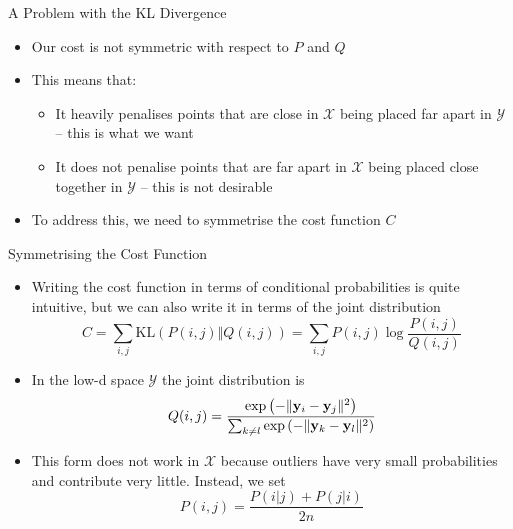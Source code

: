 \documentclass[aspectratio=169]{beamer}
\begin{document}
\begin{frame}{A Problem with the KL Divergence}
  \begin{itemize}
    \item Our cost is not symmetric with respect to $P$ and $Q$
    \item This means that:
    \begin{itemize}
      \item It heavily penalises points that are close in $\mathcal{X}$ being placed far apart in $\mathcal{Y}$ -- this is what we want
      \item It does not penalise points that are far apart in $\mathcal{X}$ being placed close together in $\mathcal{Y}$ -- this is not desirable
    \end{itemize}
    \item To address this, we need to symmetrise the cost function $C$
  \end{itemize} 
\end{frame}

\begin{frame}{Symmetrising the Cost Function}
  \begin{itemize}
    \item Writing the cost function in terms of conditional probabilities is quite intuitive, but we can also write it in terms of the joint distribution
    \begin{equation*}
      C = \sum_{i,j}\mathrm{KL}(P(i,j)\Vert Q(i,j)) = \sum_{i,j} P(i,j)\log\frac{P(i,j)}{Q(i,j)}
    \end{equation*}
    \pause
    \item In the low-d space $\mathcal{Y}$ the joint distribution is
    \begin{equation*}
      Q(i,j) = \frac{\exp\left(-\|\mathbf{y}_i-\mathbf{y}_j\|^2\right)}{\sum_{k\ne l}\exp\left(-\|\mathbf{y}_k-\mathbf{y}_l\|^2\right)}
    \end{equation*}
    \pause
    \item This form does not work in $\mathcal{X}$ because outliers have very small probabilities and contribute very little. Instead, we set
    \begin{equation*}
      P(i,j) = \frac{P(i\vert j)+P(j\vert i)}{2n}
    \end{equation*}
  \end{itemize}
\end{frame}
\end{document}
